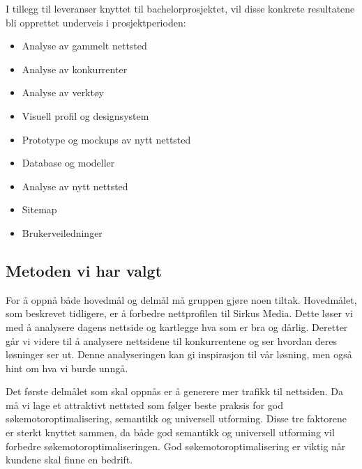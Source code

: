 
I tillegg til leveranser knyttet til bachelorprosjektet, vil disse konkrete resultatene bli opprettet underveis i prosjektperioden:
\begin{itemize}
\item Analyse av gammelt nettsted
\item Analyse av konkurrenter
\item Analyse av verktøy
\item Visuell profil og designsystem
\item Prototype og mockups av nytt nettsted
\item Database og modeller
\item Analyse av nytt nettsted
\item Sitemap
\item Brukerveiledninger
\end{itemize}

\subsection{Metoden vi har valgt}
\label{sec:metode}
For å oppnå både hovedmål og delmål må gruppen gjøre noen tiltak. Hovedmålet, som beskrevet tidligere, er å forbedre nettprofilen til Sirkus Media. Dette løser vi med å analysere dagens nettside og kartlegge hva som er bra og dårlig. Deretter går vi videre til å analysere nettsidene til konkurrentene og ser hvordan deres løsninger ser ut. Denne analyseringen kan gi inspirasjon til vår løsning, men også hint om hva vi burde unngå.

Det første delmålet som skal oppnås er å generere mer trafikk til nettsiden. Da må vi lage et attraktivt nettsted som følger beste praksis for god søkemotoroptimalisering, semantikk og universell utforming. Disse tre faktorene er sterkt knyttet sammen, da både god semantikk og universell utforming vil forbedre søkemotoroptimaliseringen. God søkemotoroptimalisering er viktig når kundene skal finne en bedrift.

